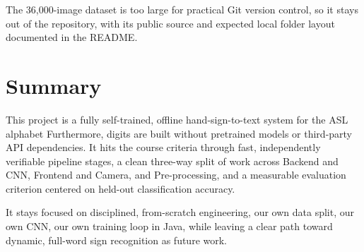 \documentclass[12pt,a4paper]{article}
\begin{document}
The 36{,}000-image dataset is too large for practical Git version control, so it stays out of
the repository, with its public source and expected local folder layout documented in the
README.


\section{Summary}

This project is a fully self-trained, offline hand-sign-to-text system for the ASL alphabet
Furthermore, digits are built without pretrained models or third-party API dependencies. It hits the course
criteria through fast, independently verifiable pipeline stages, a clean three-way split of
work across Backend and CNN, Frontend and Camera, and Pre-processing, and a measurable
evaluation criterion centered on held-out classification accuracy.

It stays focused on disciplined, from-scratch engineering, our own data split, our own CNN,
our own training loop in Java, while leaving a clear path toward dynamic, full-word sign
recognition as future work.
\end{document}
